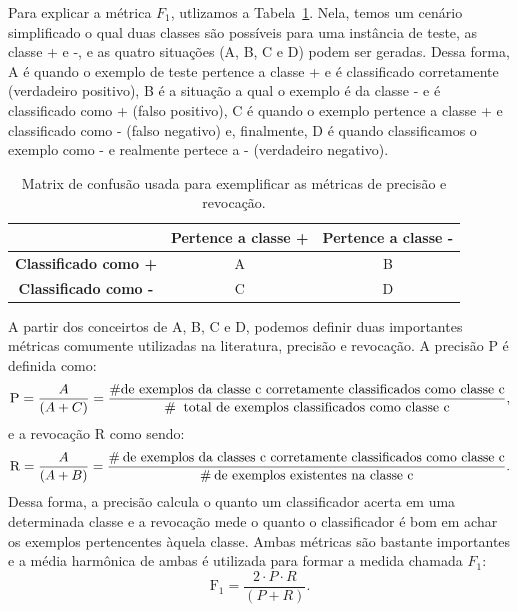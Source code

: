 Para explicar a métrica $F_1$, utlizamos a Tabela~\ref{table::confusao}. Nela, temos um cenário simplificado o qual duas classes são possíveis para uma instância de teste, as classe + e -, e as quatro situações (A, B, C e D) podem ser geradas. Dessa forma, A é quando o exemplo de teste pertence a classe + e é classificado corretamente (verdadeiro positivo), B é a situação a qual o exemplo é da classe - e é classificado como + (falso positivo), C é quando o exemplo pertence a classe + e classificado como - (falso negativo) e, finalmente, D é quando classificamos o exemplo como - e realmente pertece a - (verdadeiro negativo).

\begin{table}[ht*]
\centering
\begin{tabular}{|c|c|c|}
\toprule
       &    \textbf{Pertence a classe +} & \textbf{Pertence a classe -} \\
\midrule
    \textbf{Classificado como +}  & A & B \tabularnewline \hline
    \textbf{Classificado como -}  & C & D \tabularnewline
\bottomrule
\end{tabular}
\caption{Matrix de confusão usada para exemplificar as métricas de precisão e revocação.}
\label{table::confusao}
\end{table}

A partir dos conceirtos de A, B, C e D, podemos definir duas importantes métricas comumente utilizadas na literatura, precisão e revocação. A precisão \textsc{P} é definida como:
\begin{equation}
\textsc{P} = \frac{A}{(A+C)} = \frac{\# \text{de exemplos da classe c corretamente classificados como classe c}} {\# \: \text{ total de exemplos classificados como classe c}} \\,
\end{equation}
e a revocação \textsc{R} como sendo:
\begin{equation}
\textsc{R} = \frac{A}{(A+B)} = \frac{\# \: \text{de exemplos da classes c corretamente classificados como classe c}}{\# \: \text{de exemplos existentes na classe c}}.
\end{equation}
Dessa forma, a precisão calcula o quanto um classificador acerta em uma determinada classe e a revocação mede o quanto o classificador é bom em achar os exemplos pertencentes àquela classe.
Ambas métricas são bastante importantes e a média harmônica de ambas é utilizada para formar a medida chamada $F_1$:
\begin{equation}
\text{F}_1 = \frac{2 \cdot P \cdot R}{(P + R)}.
\end{equation}


